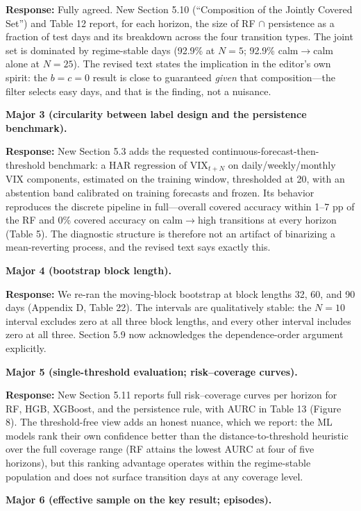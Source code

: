 \documentclass[11pt]{article}
\newcommand{\response}{\textbf{Response:} }
\begin{document}
\response Fully agreed. New Section 5.10 (``Composition of the Jointly Covered Set'') and
Table 12 report, for each horizon, the size of RF $\cap$ persistence as a fraction of test
days and its breakdown across the four transition types. The joint set is dominated by
regime-stable days (92.9\% at $N = 5$; 92.9\% calm$\to$calm alone at $N = 25$). The revised
text states the implication in the editor's own spirit: the $b = c = 0$ result is close to
guaranteed \emph{given} that composition---the filter selects easy days, and that is the
finding, not a nuisance.

\textbf{Major 3 (circularity between label design and the persistence benchmark).}

\response New Section 5.3 adds the requested continuous-forecast-then-threshold benchmark: a
HAR regression of $\text{VIX}_{t+N}$ on daily/weekly/monthly VIX components, estimated on the
training window, thresholded at 20, with an abstention band calibrated on training forecasts
and frozen. Its behavior reproduces the discrete pipeline in full---overall covered accuracy
within 1--7 pp of the RF and 0\% covered accuracy on calm$\to$high transitions at every
horizon (Table 5). The diagnostic structure is therefore not an artifact of binarizing a
mean-reverting process, and the revised text says exactly this.

\textbf{Major 4 (bootstrap block length).}

\response We re-ran the moving-block bootstrap at block lengths 32, 60, and 90 days
(Appendix D, Table 22). The intervals are qualitatively stable: the $N = 10$ interval excludes
zero at all three block lengths, and every other interval includes zero at all three. Section
5.9 now acknowledges the dependence-order argument explicitly.

\textbf{Major 5 (single-threshold evaluation; risk--coverage curves).}

\response New Section 5.11 reports full risk--coverage curves per horizon for RF, HGB,
XGBoost, and the persistence rule, with AURC in Table 13 (Figure 8). The threshold-free view
adds an honest nuance, which we report: the ML models rank their own confidence better than
the distance-to-threshold heuristic over the full coverage range (RF attains the lowest AURC
at four of five horizons), but this ranking advantage operates within the regime-stable
population and does not surface transition days at any coverage level.

\textbf{Major 6 (effective sample on the key result; episodes).}
\end{document}
